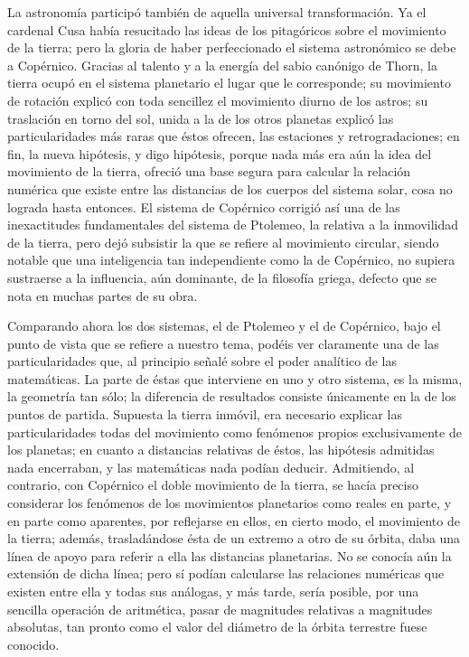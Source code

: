 \documentclass[a4paper, 12pt]{article}
\begin{document}
La astronomía participó también de aquella universal transformación. Ya el cardenal Cusa había resucitado las ideas de los pitagóricos sobre el movimiento de la tierra; pero  la gloria de haber perfeccionado el sistema astronómico se debe a Copérnico. Gracias al talento y a la energía del sabio canónigo de Thorn, la tierra ocupó en el sistema planetario el lugar que le corresponde; su movimiento de rotación explicó con toda sencillez el movimiento diurno de los astros; su traslación en torno del sol, unida a la de los otros planetas explicó las particularidades más raras que éstos ofrecen, las estaciones y retrogradaciones; en fin, la nueva hipótesis, y digo hipótesis, porque nada más era aún la idea del movimiento de la tierra, ofreció una base segura para calcular la relación numérica que existe entre las distancias de los cuerpos del sistema solar, cosa no lograda hasta entonces. El sistema de Copérnico corrigió así una de las inexactitudes fundamentales del sistema de Ptolemeo, la relativa a la inmovilidad de la tierra, pero dejó subsistir la que se refiere al movimiento circular, siendo notable que una inteligencia tan independiente como la de Copérnico, no supiera sustraerse a la influencia, aún dominante, de la filosofía griega, defecto que se nota en muchas partes de su obra.

Comparando ahora los dos sistemas, el de Ptolemeo y el de Copérnico, bajo el punto de vista que se refiere a nuestro tema, podéis ver claramente una de las particularidades que, al principio señalé sobre el poder analítico de las matemáticas. La parte de éstas que interviene en uno y otro sistema, es la misma, la geometría tan sólo; la diferencia de resultados consiste únicamente en la de los puntos de partida. Supuesta la tierra inmóvil, era necesario explicar las particularidades todas del movimiento como fenómenos propios exclusivamente de los planetas; en cuanto a distancias relativas de éstos, las hipótesis admitidas nada encerraban, y las matemáticas nada podían deducir. Admitiendo, al contrario, con Copérnico el doble movimiento de la tierra, se hacía preciso considerar los fenómenos de los movimientos planetarios como reales en parte, y en parte como aparentes, por reflejarse en ellos, en cierto modo, el movimiento de la tierra; además, trasladándose ésta de un extremo a otro de su órbita, daba una línea de apoyo para referir a ella las distancias planetarias. No se conocía aún la extensión de dicha línea; pero sí podían calcularse las relaciones numéricas que existen entre ella y todas sus análogas, y más tarde, sería posible, por una sencilla operación de aritmética, pasar de magnitudes relativas a magnitudes absolutas, tan pronto como el valor del diámetro de la órbita terrestre fuese conocido.
\end{document}
